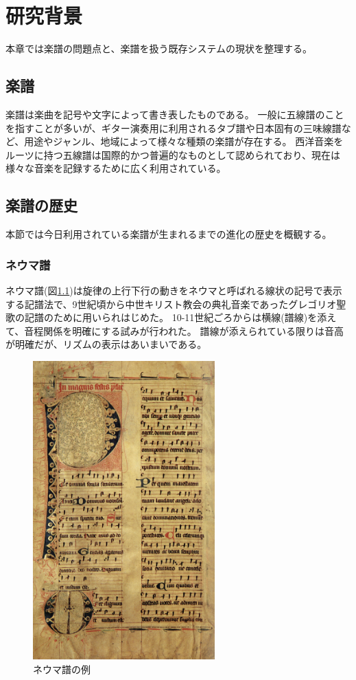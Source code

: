 \chapter{研究背景}
\label{chap:haikei}

本章では楽譜の問題点と、楽譜を扱う既存システムの現状を整理する。

\newpage

\section{楽譜}

楽譜は楽曲を記号や文字によって書き表したものである。
一般に五線譜のことを指すことが多いが、ギター演奏用に利用されるタブ譜や日本固有の三味線譜など、用途やジャンル、地域によって様々な種類の楽譜が存在する。
西洋音楽をルーツに持つ五線譜は国際的かつ普遍的なものとして認められており、現在は様々な音楽を記録するために広く利用されている。

\section{楽譜の歴史}

本節では今日利用されている楽譜が生まれるまでの進化の歴史を概観する\cite{Minagawa}。

\subsection{ネウマ譜}
ネウマ譜(図\ref{neume})は旋律の上行下行の動きをネウマと呼ばれる線状の記号で表示する記譜法で、9世紀頃から中世キリスト教会の典礼音楽であったグレゴリオ聖歌の記譜のために用いられはじめた。
10-11世紀ごろからは横線(譜線)を添えて、音程関係を明確にする試みが行われた。
譜線が添えられている限りは音高が明確だが、リズムの表示はあいまいである。

\begin{figure}[H]
    \centering
    \includegraphics[width=7cm]{images/neume.png}
    \caption{ネウマ譜の例}
    \label{neume}
\end{figure}

